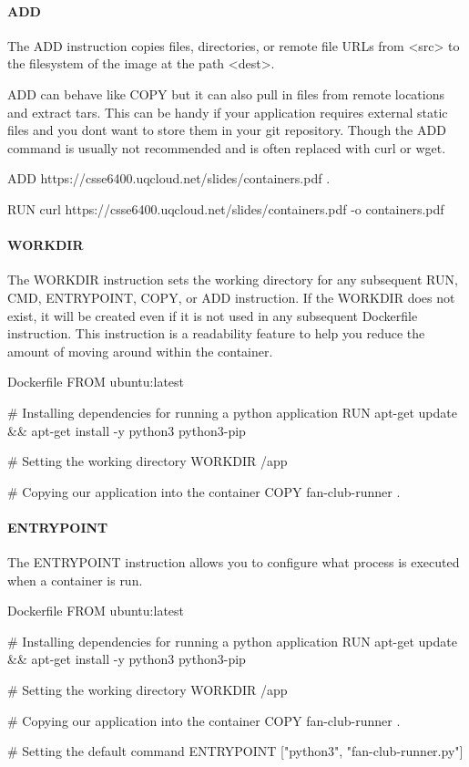 \documentclass{csse4400}
\begin{document}
\paragraph{ADD}
The ADD instruction copies files, directories, or remote file URLs from <src> to the filesystem of the image at the path <dest>.

ADD can behave like COPY but it can also pull in files from remote locations and extract tars.
This can be handy if your application requires external static files and you dont want to store them in your git repository.
Though the ADD command is usually not recommended and is often replaced with curl or wget.

\begin{code}[language=docker,numbers=none]{}
ADD https://csse6400.uqcloud.net/slides/containers.pdf .
\end{code}
\begin{code}[language=docker,numbers=none]{}
RUN curl https://csse6400.uqcloud.net/slides/containers.pdf -o containers.pdf
\end{code}

\paragraph{WORKDIR}
The WORKDIR instruction sets the working directory for any subsequent RUN, CMD, ENTRYPOINT, COPY, or ADD instruction.
If the WORKDIR does not exist, it will be created even if it is not used in any subsequent Dockerfile instruction.
This instruction is a readability feature to help you reduce the amount of moving around within the container.

\begin{code}[language=docker,numbers=none]{Dockerfile}
FROM ubuntu:latest

# Installing dependencies for running a python application
RUN apt-get update && apt-get install -y python3 python3-pip

# Setting the working directory
WORKDIR /app

# Copying our application into the container
COPY fan-club-runner .
\end{code}


\paragraph{ENTRYPOINT}
The ENTRYPOINT instruction allows you to configure what process is executed when a container is run.

\begin{code}[language=docker,numbers=none]{Dockerfile}
FROM ubuntu:latest

# Installing dependencies for running a python application
RUN apt-get update && apt-get install -y python3 python3-pip

# Setting the working directory
WORKDIR /app

# Copying our application into the container
COPY fan-club-runner .

# Setting the default command
ENTRYPOINT ["python3", "fan-club-runner.py"]
\end{code}
\end{document}
